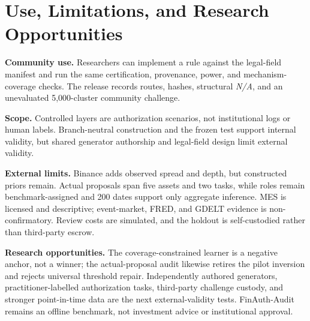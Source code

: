 \section{Use, Limitations, and Research Opportunities}

\textbf{Community use.} Researchers can implement a rule against the legal-field manifest and run the same certification, provenance, power, and mechanism-coverage checks. The release records routes, hashes, structural \textit{N/A}, and an unevaluated 5,000-cluster community challenge.

\textbf{Scope.} Controlled layers are authorization scenarios, not institutional logs or human labels. Branch-neutral construction and the frozen test support internal validity, but shared generator authorship and legal-field design limit external validity.

\textbf{External limits.} Binance adds observed spread and depth, but constructed priors remain. Actual proposals span five assets and two tasks, while roles remain benchmark-assigned and 200 dates support only aggregate inference. MES is licensed and descriptive; event-market, FRED, and GDELT evidence is non-confirmatory. Review costs are simulated, and the holdout is self-custodied rather than third-party escrow.

\textbf{Research opportunities.} The coverage-constrained learner is a negative anchor, not a winner; the actual-proposal audit likewise retires the pilot inversion and rejects universal threshold repair. Independently authored generators, practitioner-labelled authorization tasks, third-party challenge custody, and stronger point-in-time data are the next external-validity tests. FinAuth-Audit remains an offline benchmark, not investment advice or institutional approval.
